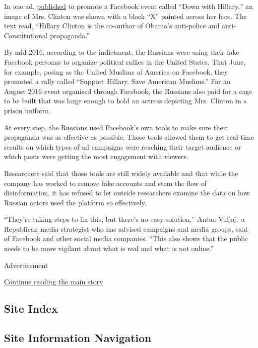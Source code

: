 In one ad,
\href{https://www.nytimes3xbfgragh.onion/2017/11/01/us/politics/russia-2016-election-facebook.html}{published}
to promote a Facebook event called ``Down with Hillary,'' an image of
Mrs. Clinton was shown with a black ``X'' painted across her face. The
text read, ``Hillary Clinton is the co-author of Obama's anti-police and
anti-Constitutional propaganda.''

By mid-2016, according to the indictment, the Russians were using their
fake Facebook personas to organize political rallies in the United
States. That June, for example, posing as the United Muslims of America
on Facebook, they promoted a rally called ``Support Hillary. Save
American Muslims.'' For an August 2016 event organized through Facebook,
the Russians also paid for a cage to be built that was large enough to
hold an actress depicting Mrs. Clinton in a prison uniform.

At every step, the Russians used Facebook's own tools to make sure their
propaganda was as effective as possible. Those tools allowed them to get
real-time results on which types of ad campaigns were reaching their
target audience or which posts were getting the most engagement with
viewers.

Researchers said that those tools are still widely available and that
while the company has worked to remove fake accounts and stem the flow
of disinformation, it has refused to let outside researchers examine the
data on how Russian actors used the platform so effectively.

``They're taking steps to fix this, but there's no easy solution,''
Anton Vuljaj, a Republican media strategist who has advised campaigns
and media groups, said of Facebook and other social media companies.
``This also shows that the public needs to be more vigilant about what
is real and what is not online.''

Advertisement

\protect\hyperlink{after-bottom}{Continue reading the main story}

\hypertarget{site-index}{%
\subsection{Site Index}\label{site-index}}

\hypertarget{site-information-navigation}{%
\subsection{Site Information
Navigation}\label{site-information-navigation}}

